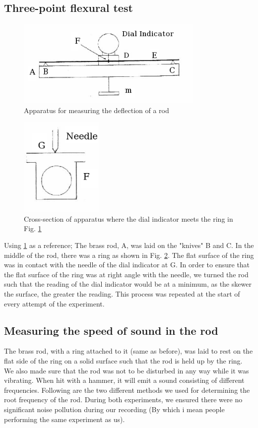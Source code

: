 \documentclass[%
 reprint,
 amsmath,amssymb,
 aps,
]{revtex4-1}
\begin{document}
  \subsection{Three-point flexural test}

    \begin{figure}[h!]
      \center
      \includegraphics[width=9cm]{scripts/figs/aparatus1.png}
      \caption{Apparatus for measuring the deflection of a rod}
      \label{fig:aparatus1}
    \end{figure}

    \begin{figure}[h!]
      \center
      \includegraphics[width=4cm]{scripts/figs/aparatus1cs.png}
      \caption{Cross-section of apparatus where the dial indicator meets the ring in Fig. \ref{fig:aparatus1}}
      \label{fig:aparatus1cs}
    \end{figure}

    Using \ref{fig:aparatus1} as a reference; The brass rod, A, was laid on the "knives" B and C. In the middle of the rod, there was a ring as shown in Fig. \ref{fig:aparatus1cs}. The flat surface of the ring was in contact with the needle of the dial indicator at G. In order to ensure that the flat surface of the ring was at right angle with the needle, we turned the rod such that the reading of the dial indicator would be at a minimum, as the skewer the surface, the greater the reading. This process was repeated at the start of every attempt of the experiment.
    
  \subsection{Measuring the speed of sound in the rod}
      The brass rod, with a ring attached to it (same as before), was laid to rest on the flat side of the ring on a solid surface such that the rod is held up by the ring. We also made sure that the rod was not to be disturbed in any way while it was vibrating. When hit with a hammer, it will emit a sound consisting of different frequencies. Following are the two different methods we used for determining the root frequency of the rod.
      During both experiments, we ensured there were no significant noise pollution during our recording (By which i mean people performing the same experiment as us).
\end{document}
